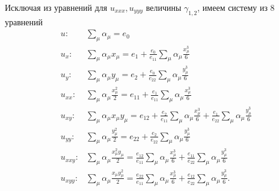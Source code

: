 \documentclass[12pt]{article}
\begin{document}
Исключая из уравнений для $u_{xxx}, u_{yyy}$ величины $\gamma_{1,2}$, имеем систему из 8 уравнений
\begin{align*}
u: &\sum_\mu \alpha_\mu = e_0\\
u_x: &\sum_\mu \alpha_\mu x_\mu = e_1 + \frac{e_0}{e_{11}}\sum_\mu \alpha_\mu \frac{x_\mu^3}{6}\\
u_y: &\sum_\mu \alpha_\mu y_\mu = e_2 + \frac{e_0}{e_{22}}\sum_\mu \alpha_\mu \frac{y_\mu^3}{6}\\
u_{xx}: &\sum_\mu \alpha_\mu \frac{x_\mu^2}{2} = e_{11} + \frac{e_1}{e_{11}}\sum_\mu \alpha_\mu \frac{x_\mu^3}{6}\\
u_{xy}: &\sum_\mu \alpha_\mu x_\mu y_\mu = e_{12} + \frac{e_2}{e_{11}}\sum_\mu \alpha_\mu \frac{x_\mu^3}{6} + \frac{e_1}{e_{22}}\sum_\mu \alpha_\mu \frac{y_\mu^3}{6}\\
u_{yy}: &\sum_\mu \alpha_\mu \frac{y_\mu^2}{2} = e_{22} + \frac{e_2}{e_{22}}\sum_\mu \alpha_\mu \frac{y_\mu^3}{6}\\
u_{xxy}: &\sum_\mu \alpha_\mu \frac{x_\mu^2 y_\mu}{2} = \frac{e_{12}}{e_{11}}\sum_\mu \alpha_\mu \frac{x_\mu^3}{6} + \frac{e_{11}}{e_{22}}\sum_\mu \alpha_\mu \frac{y_\mu^3}{6}\\
u_{xyy}: &\sum_\mu \alpha_\mu \frac{x_\mu y_\mu^2}{2} = \frac{e_{22}}{e_{11}}\sum_\mu \alpha_\mu \frac{x_\mu^3}{6} + \frac{e_{12}}{e_{22}}\sum_\mu \alpha_\mu \frac{y_\mu^3}{6}.
\end{align*}
\end{document}
